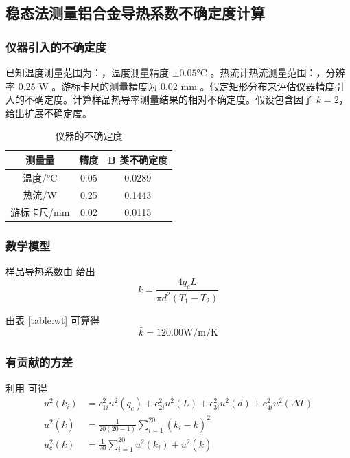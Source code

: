 \documentclass[a4paper,utf8]{article}
\newcommand{\TTR}[0]{\watt\per\m\per\K}
\begin{document}
\subsection{稳态法测量铝合金导热系数不确定度计算}
\subsubsection{仪器引入的不确定度}
已知温度测量范围为：，温度测量精度 $\pm 0.05 \unit{\degreeCelsius}$ 。热流计热流测量范围：\linebreak {}，分辨率 0.25 \unit{\watt} 。游标卡尺的测量精度为 0.02 \unit{\mm} 。假定矩形分布来评估仪器精度引入的不确定度。计算样品热导率测量结果的相对不确定度。假设包含因子 $k=2$，给出扩展不确定度。
\begin{table}[!ht]
    \caption{仪器的不确定度}
    \begin{tabularx}{0.7\textwidth}{*{3}{C}}\toprule
        测量量 & 精度 & B 类不确定度 \\ \midrule
        温度/\unit{\degreeCelsius} & 0.05 & 0.0289 \\
        热流/\unit{\W} & 0.25 & 0.1443 \\
        游标卡尺/\unit{\mm} & 0.02 & 0.0115 \\ \bottomrule
    \end{tabularx}
\end{table}
\subsubsection{数学模型}
    样品导热系数由 给出
    \begin{equation}
        k=\frac{4q_c L}{\pi d^2(T_1-T_2)} \label{eq:4}
    \end{equation}\par
    由表 \ref{table:wt} 可算得
    \begin{equation}
        \bar{k}=120.00 \unit{\TTR}
    \end{equation}
\subsubsection{有贡献的方差}
利用 可得
\begin{align}
    u^2(k_i)&=c_{1i}^2u^2(q_c)+c_{2i}^2u^2(L)+c_{3i}^2u^2(d)+c_{4i}^2u^2(\Delta T) \\
    u^2(\bar{k})&=\frac{1}{20(20-1)}\sum_{i=1}^{20}(k_i-\bar{k})^2 \\ 
    u_c^2(k)&=\frac{1}{20}\sum_{i=1}^{20}u^2(k_i)+u^2(\bar{k}) \label{eq:5}
\end{align}
\end{document}
